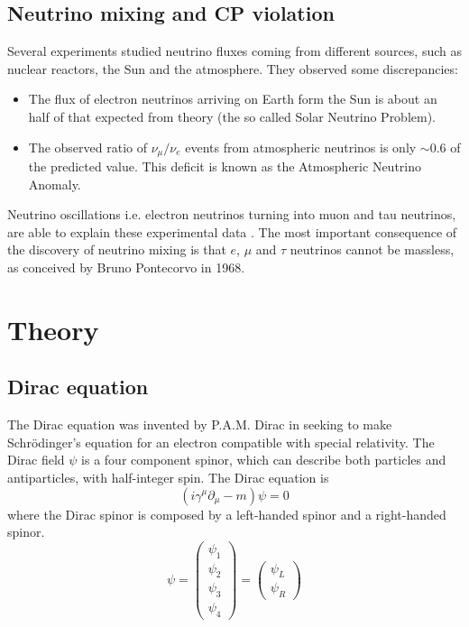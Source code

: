 \documentclass{subnucbo}
\begin{document}
\subsection{Neutrino mixing and CP violation}
Several experiments studied neutrino fluxes coming from different sources, such as nuclear reactors, the Sun and the atmosphere. They observed some discrepancies:
\begin{itemize}
\item The flux of electron neutrinos arriving on Earth form the Sun is about an half of that expected from theory (the so called Solar Neutrino Problem).
\item The observed ratio of $\nu_{\mu}/\nu_e$ events from atmospheric neutrinos is only $\sim0.6$ of the predicted value. This deficit is known as the Atmospheric Neutrino Anomaly.
\end{itemize}
Neutrino oscillations i.e. electron neutrinos turning into muon and tau neutrinos, are able to explain these experimental data \cite{ref:wrap}. The most important consequence of the discovery of neutrino mixing is that $e$, $\mu$ and $\tau$ neutrinos cannot be massless, as conceived by Bruno Pontecorvo in 1968. 

\section{Theory}

\subsection{Dirac equation}
The Dirac equation was invented by P.A.M. Dirac in seeking to make Schrödinger's equation for an electron compatible with special relativity. The Dirac field $\psi$ is a four component spinor, which can describe both particles and antiparticles, with half-integer spin.
The Dirac equation is
\begin{equation}
\label{eq:dir}
(i\gamma^{\mu}\partial_{\mu}-m)\psi=0
\end{equation}
where the Dirac spinor is composed by a left-handed spinor and a right-handed spinor. %
\begin{equation} 
\psi=\begin{pmatrix}\psi_1\\ \psi_2 \\ \psi_3 \\ \psi_4 \end{pmatrix}=\begin{pmatrix}\psi_L\\ \psi_R \end{pmatrix}
\end{equation}
\end{document}
